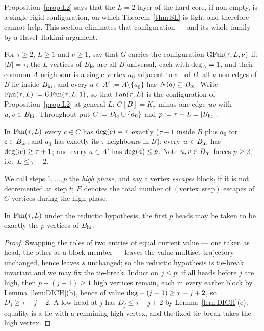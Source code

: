 Proposition~\ref{prop:L2} says that the $L = 2$ layer of the hard core, if non-empty, is a
single rigid configuration, on which Theorem~\ref{thm:SL} is tight and therefore cannot
help. This section eliminates that configuration --- and its whole family --- by a
Havel--Hakimi argument.

\begin{definition}\label{def:fan}
For $\tau \ge 2$, $L \ge 1$ and $\nu \ge 1$, say that $G$ carries the configuration
$\mathrm{GFan}(\tau,L,\nu)$ if: $|B| = \tau$; the $L$ vertices of $B_{\mathrm{lo}}$ are all $B$-universal, each
with $\mathrm{deg}_A = 1$, and their common $A$-neighbour is a single vertex $a_0$ adjacent to all
of $B$; all $\nu$ non-edges of $B$ lie inside $B_{\mathrm{hi}}$; and every $a \in A' := A \setminus
\{a_0\}$ has $N(a) \subseteq B_{\mathrm{hi}}$. Write $\mathrm{Fan}(\tau,L) := \mathrm{GFan}(\tau,L,1)$, so that
$\mathrm{Fan}(\tau,L)$ is the configuration of Proposition~\ref{prop:L2} at general $L$:
$G[B] = K_\tau$ minus one edge $uv$ with $u,v \in B_{\mathrm{hi}}$.
Throughout put $C := B_{\mathrm{lo}} \cup \{a_0\}$ and $p := \tau - L = |B_{\mathrm{hi}}|$.
\end{definition}

In $\mathrm{Fan}(\tau,L)$ every $c \in C$ has $\mathrm{deg}(c) = \tau$ exactly ($\tau-1$ inside $B$ plus
$a_0$ for $c \in B_{\mathrm{lo}}$; and $a_0$ has exactly its $\tau$ neighbours in $B$); every
$w \in B_{\mathrm{hi}}$ has $\mathrm{deg}(w) \ge \tau+1$; and every $a \in A'$ has $\mathrm{deg}(a) \le p$. Note
$u,v \in B_{\mathrm{hi}}$ forces $p \ge 2$, i.e.\ $L \le \tau-2$.

We call steps $1,\dots,p$ the \emph{high phase}, and say a vertex \emph{escapes}
$\mathrm{block}_t$ if it is not decremented at step $t$; $E$ denotes the total number of
$(\text{vertex},\text{step})$ escapes of $C$-vertices during the high phase.

\begin{lemma}\label{lem:FAN1}
In $\mathrm{Fan}(\tau,L)$ under the reductio hypothesis, the first $p$ heads may be taken to be
exactly the $p$ vertices of $B_{\mathrm{hi}}$.
\end{lemma}

\begin{proof}
Swapping the roles of two entries of equal current value --- one taken as head, the other as
a block member --- leaves the value multiset trajectory unchanged, hence leaves $s$
unchanged; so the reductio hypothesis is tie-break invariant and we may fix the tie-break.
Induct on $j \le p$: if all heads before $j$ are high, then $p - (j-1) \ge 1$ high vertices
remain, each in every earlier block by Lemma~\ref{lem:DICH}(b), hence of value
$\mathrm{deg} - (j-1) \ge \tau-j+2$, so $D_j \ge \tau-j+2$. A low head at $j$ has
$D_j \le \tau-j+2$ by Lemma~\ref{lem:DICH}(c); equality is a tie with a remaining high
vertex, and the fixed tie-break takes the high vertex.
\end{proof}


